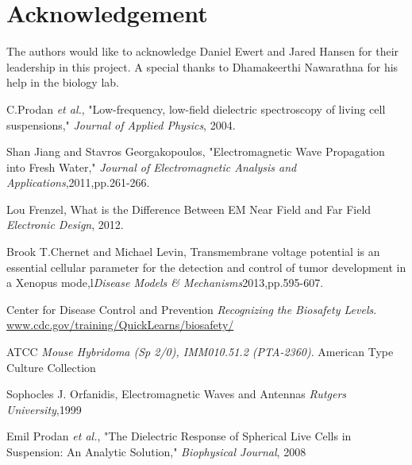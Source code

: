 \documentclass[journal]{IEEEtran}
\begin{document}
\section{Acknowledgement}
The authors would like to acknowledge Daniel Ewert and Jared Hansen for their leadership in this project. A special thanks to Dhamakeerthi Nawarathna for his help in the biology lab.

\begin{thebibliography}{9}

C.Prodan \textit{et al.},
"Low-frequency, low-field dielectric spectroscopy of living cell suspensions,"
\textit{Journal of Applied Physics}, 2004.

Shan Jiang and Stavros Georgakopoulos,
"Electromagnetic Wave Propagation into Fresh Water,"
\textit{Journal of Electromagnetic Analysis and Applications},2011,pp.261-266.

Lou Frenzel,
What is the Difference Between EM Near Field and Far Field
\textit{Electronic Design}, 2012.

Brook T.Chernet and Michael Levin,
Transmembrane voltage potential is an essential cellular parameter for the detection and control of tumor development in a Xenopus mode,l\textit{Disease Models \& Mechanisms}2013,pp.595-607.

Center for Disease Control and Prevention
\textit{Recognizing the Biosafety Levels}.
\url{www.cdc.gov/training/QuickLearns/biosafety/}

ATCC
\textit{Mouse Hybridoma (Sp 2/0), IMM010.51.2 (PTA-2360)}.
American Type Culture Collection

Sophocles J. Orfanidis,
Electromagnetic Waves and Antennas
\textit{Rutgers University},1999

Emil Prodan \textit{et al.},
"The Dielectric Response of Spherical Live Cells in Suspension: An Analytic Solution," \textit{Biophysical Journal}, 2008

\end{thebibliography}
\end{document}
